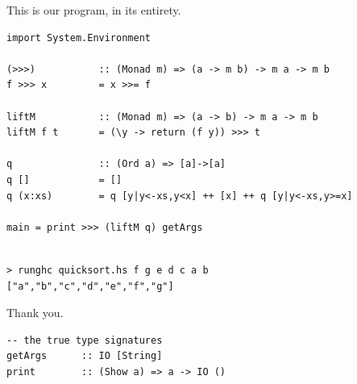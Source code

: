 \documentclass[xcolor=pdftex,dvipsnames,table]{beamer}
\begin{document}
\begin{frame}[fragile]
This is our program, in its entirety.
{\scriptsize
\begin{lstlisting}
import System.Environment

(>>>)           :: (Monad m) => (a -> m b) -> m a -> m b
f >>> x         = x >>= f

liftM           :: (Monad m) => (a -> b) -> m a -> m b
liftM f t       = (\y -> return (f y)) >>> t

q               :: (Ord a) => [a]->[a]
q []            = []
q (x:xs)        = q [y|y<-xs,y<x] ++ [x] ++ q [y|y<-xs,y>=x]

main = print >>> (liftM q) getArgs
\end{lstlisting}
\begin{verbatim}

> runghc quicksort.hs f g e d c a b
["a","b","c","d","e","f","g"]
\end{verbatim} }
\end{frame}

\begin{frame}
\begin{center}
    {\Huge \textcolor{title}{Thank you.}}
\end{center}
\end{frame}

\begin{frame}[fragile]
\begin{verbatim}
-- the true type signatures
getArgs      :: IO [String]
print        :: (Show a) => a -> IO ()
\end{verbatim}
\end{frame}
\end{document}
